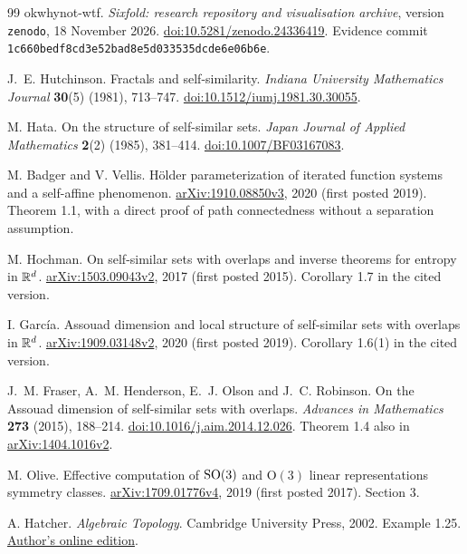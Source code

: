 \begin{thebibliography}{99}
okwhynot-wtf.
\emph{Sixfold: research repository and visualisation archive}, version
\texttt{zenodo}, 18 November 2026.
\href{https://doi.org/10.5281/zenodo.24336419}{doi:10.5281/zenodo.24336419}.
Evidence commit \texttt{1c660bedf8cd3e52bad8e5d033535dcde6e06b6e}.

J.~E. Hutchinson.
Fractals and self-similarity.
\emph{Indiana University Mathematics Journal} \textbf{30}(5) (1981), 713--747.
\href{https://doi.org/10.1512/iumj.1981.30.30055}{doi:10.1512/iumj.1981.30.30055}.

M. Hata.
On the structure of self-similar sets.
\emph{Japan Journal of Applied Mathematics} \textbf{2}(2) (1985), 381--414.
\href{https://doi.org/10.1007/BF03167083}{doi:10.1007/BF03167083}.

M. Badger and V. Vellis.
H\"older parameterization of iterated function systems and a self-affine phenomenon.
\href{https://arxiv.org/abs/1910.08850v3}{arXiv:1910.08850v3}, 2020
(first posted 2019). Theorem 1.1, with a direct proof of path connectedness
without a separation assumption.

M. Hochman.
On self-similar sets with overlaps and inverse theorems for entropy in $\mathbb R^d$.
\href{https://arxiv.org/abs/1503.09043v2}{arXiv:1503.09043v2}, 2017
(first posted 2015). Corollary 1.7 in the cited version.

I. Garc\'ia.
Assouad dimension and local structure of self-similar sets with overlaps
in $\mathbb R^d$.
\href{https://arxiv.org/abs/1909.03148v2}{arXiv:1909.03148v2}, 2020
(first posted 2019). Corollary 1.6(1) in the cited version.

J.~M. Fraser, A.~M. Henderson, E.~J. Olson and J.~C. Robinson.
On the Assouad dimension of self-similar sets with overlaps.
\emph{Advances in Mathematics} \textbf{273} (2015), 188--214.
\href{https://doi.org/10.1016/j.aim.2014.12.026}{doi:10.1016/j.aim.2014.12.026}.
Theorem 1.4 also in \href{https://arxiv.org/abs/1404.1016v2}{arXiv:1404.1016v2}.

M. Olive.
Effective computation of $\mathrm{SO}(3)$ and $\mathrm O(3)$ linear representations
symmetry classes.
\href{https://arxiv.org/abs/1709.01776v4}{arXiv:1709.01776v4}, 2019
(first posted 2017). Section 3.

A. Hatcher.
\emph{Algebraic Topology}.
Cambridge University Press, 2002. Example 1.25.
\href{https://pi.math.cornell.edu/~hatcher/AT/AT-doublepage.pdf}{Author's online edition}.


\end{thebibliography}
